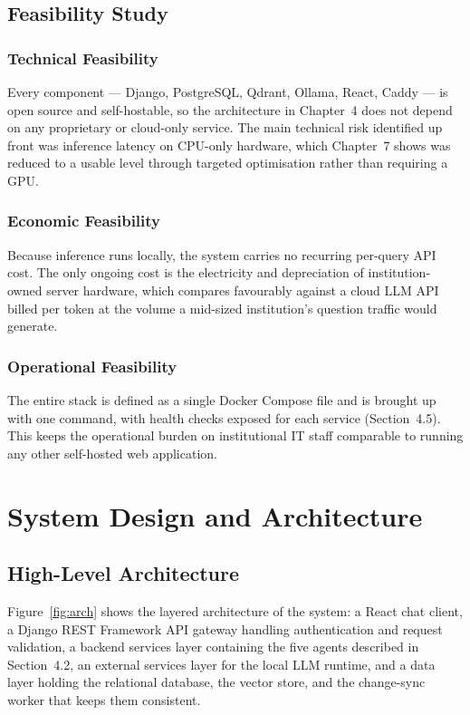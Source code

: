 \documentclass[11pt,a4paper,oneside]{report}
\begin{document}
\section{Feasibility Study}

\subsection{Technical Feasibility}
Every component --- Django, PostgreSQL, Qdrant, Ollama, React, Caddy --- is
open source and self-hostable, so the architecture in Chapter~4 does not
depend on any proprietary or cloud-only service. The main technical risk
identified up front was inference latency on CPU-only hardware, which
Chapter~7 shows was reduced to a usable level through targeted optimisation
rather than requiring a GPU.

\subsection{Economic Feasibility}
Because inference runs locally, the system carries no recurring per-query API
cost. The only ongoing cost is the electricity and depreciation of
institution-owned server hardware, which compares favourably against a
cloud LLM API billed per token at the volume a mid-sized institution's
question traffic would generate.

\subsection{Operational Feasibility}
The entire stack is defined as a single Docker Compose file and is brought up
with one command, with health checks exposed for each service (Section~4.5).
This keeps the operational burden on institutional IT staff comparable to
running any other self-hosted web application.

\chapter{System Design and Architecture}

\section{High-Level Architecture}

Figure~\ref{fig:arch} shows the layered architecture of the system: a React
chat client, a Django REST Framework API gateway handling authentication and
request validation, a backend services layer containing the five agents
described in Section~4.2, an external services layer for the local LLM
runtime, and a data layer holding the relational database, the vector store,
and the change-sync worker that keeps them consistent.
\end{document}
